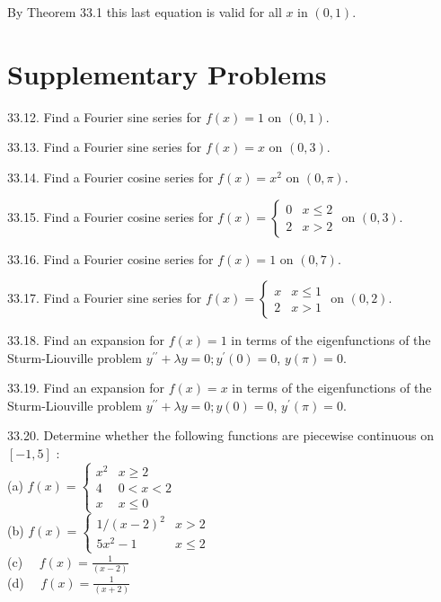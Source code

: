 \documentclass[10pt]{article}
\begin{document}
By Theorem 33.1 this last equation is valid for all $x$ in $(0,1)$.

\section*{Supplementary Problems}
33.12. Find a Fourier sine series for $f(x)=1$ on $(0,1)$.

33.13. Find a Fourier sine series for $f(x)=x$ on $(0,3)$.

33.14. Find a Fourier cosine series for $f(x)=x^{2}$ on $(0, \pi)$.

33.15. Find a Fourier cosine series for $f(x)=\left\{\begin{array}{ll}0 & x \leq 2 \\ 2 & x>2\end{array}\right.$ on $(0,3)$.

33.16. Find a Fourier cosine series for $f(x)=1$ on $(0,7)$.

33.17. Find a Fourier sine series for $f(x)=\left\{\begin{array}{ll}x & x \leq 1 \\ 2 & x>1\end{array}\right.$ on $(0,2)$.

33.18. Find an expansion for $f(x)=1$ in terms of the eigenfunctions of the Sturm-Liouville problem $y^{\prime \prime}+\lambda y=0 ; y^{\prime}(0)=0$, $y(\pi)=0$.

33.19. Find an expansion for $f(x)=x$ in terms of the eigenfunctions of the Sturm-Liouville problem $y^{\prime \prime}+\lambda y=0 ; y(0)=0$, $y^{\prime}(\pi)=0$.

33.20. Determine whether the following functions are piecewise continuous on $[-1,5]$ :\\
(a) $f(x)=\left\{\begin{array}{rr}x^{2} & x \geq 2 \\ 4 & 0<x<2 \\ x & x \leq 0\end{array}\right.$\\
(b) $f(x)= \begin{cases}1 /(x-2)^{2} & x>2 \\ 5 x^{2}-1 & x \leq 2\end{cases}$\\
(c) $\quad f(x)=\frac{1}{(x-2)}$\\
(d) $\quad f(x)=\frac{1}{(x+2)}$
\end{document}
